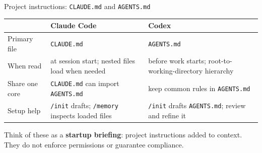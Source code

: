 \begin{frame}{Project instructions: \texttt{CLAUDE.md} and \texttt{AGENTS.md}}
  \vfill
  \begin{center}\small
  \renewcommand{\arraystretch}{1.12}
  \begin{tabular}{@{}>{\raggedright\arraybackslash}p{2.7cm}>{\raggedright\arraybackslash}p{4.7cm}>{\raggedright\arraybackslash}p{4.7cm}@{}}
    \toprule
    & \textbf{Claude Code} & \textbf{Codex} \\
    \midrule
    Primary file & \texttt{CLAUDE.md} & \texttt{AGENTS.md} \\
    When read & at session start; nested files load when needed & before work starts; root-to-working-directory hierarchy \\
    Share one core & \texttt{CLAUDE.md} can import \texttt{AGENTS.md} & keep common rules in \texttt{AGENTS.md} \\
    Setup help & \texttt{/init} drafts; \texttt{/memory} inspects loaded files & \texttt{/init} drafts \texttt{AGENTS.md}; review and refine it \\
    \bottomrule
  \end{tabular}
  \end{center}
  \vspace{0.35em}
  \begin{center}
    \small Think of these as a \textbf{startup briefing}: project instructions added to context. They do not enforce permissions or guarantee compliance.
  \end{center}
  \vspace{0.5cm plus 1fill}
\end{frame}

